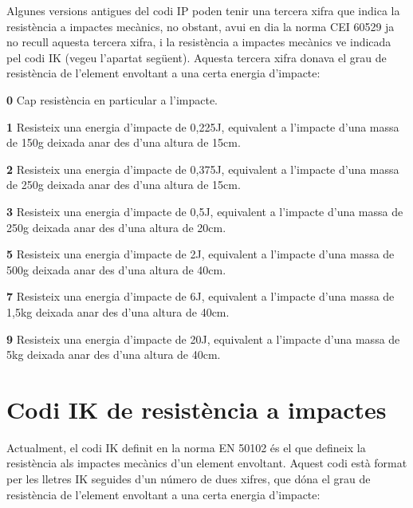 Algunes versions antigues del codi \textsf{IP} poden tenir una tercera xifra que indica la resist\`{e}ncia a impactes mec\`{a}nics, no obstant, avui en dia la norma \textsf{CEI 60529} ja no recull aquesta tercera xifra, i la resist\`{e}ncia a impactes mec\`{a}nics ve indicada pel codi \textsf{IK} (vegeu l'apartat seg\"{u}ent). Aquesta tercera xifra donava el grau de resist\`{e}ncia de l'element envoltant a una certa energia d'impacte:
\begin{list}{}
   {\setlength{\labelwidth}{10mm} \setlength{\leftmargin}{10mm} \setlength{\labelsep}{2mm}}
   \item[\textbf{0}] Cap resist\`{e}ncia en particular a l'impacte.
   \item[\textbf{1}] Resisteix una energia d'impacte de 0{,}225\unit{J}, equivalent a l'impacte d'una massa de 150\unit{g} deixada anar des d'una altura de 15\unit{cm}.
   \item[\textbf{2}] Resisteix una energia d'impacte de 0{,}375\unit{J}, equivalent a l'impacte d'una massa de 250\unit{g} deixada anar des d'una altura de 15\unit{cm}.
   \item[\textbf{3}] Resisteix una energia d'impacte de 0{,}5\unit{J}, equivalent a l'impacte d'una massa de 250\unit{g} deixada anar des d'una altura de 20\unit{cm}.
   \item[\textbf{5}] Resisteix una energia d'impacte de 2\unit{J}, equivalent a l'impacte d'una massa de 500\unit{g} deixada anar des d'una altura de 40\unit{cm}.
   \item[\textbf{7}] Resisteix una energia d'impacte de 6\unit{J}, equivalent a l'impacte d'una massa de 1{,}5\unit{kg} deixada anar des d'una altura de 40\unit{cm}.
   \item[\textbf{9}]Resisteix una energia d'impacte de 20\unit{J}, equivalent a l'impacte d'una massa de 5\unit{kg} deixada anar des d'una altura de 40\unit{cm}.
\end{list}

\section{Codi IK de resist\`{e}ncia a impactes}   

Actualment, el codi \textsf{IK} definit en la norma \textsf{EN 50102} \'{e}s el que defineix la resist\`{e}ncia  als impactes mec\`{a}nics d'un element  envoltant. Aquest codi est\`{a} format per les lletres \textsf{IK} seguides d'un n\'{u}mero de dues xifres, que d\'{o}na el grau de resist\`{e}ncia de l'element envoltant a una certa energia d'impacte:

